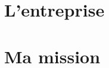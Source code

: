 \documentclass[12pt]{report}
\begin{document}
	

	
	\tableofcontents
	
	\part{L'entreprise}
		
		
	\part{Ma mission}
		
\end{document}
